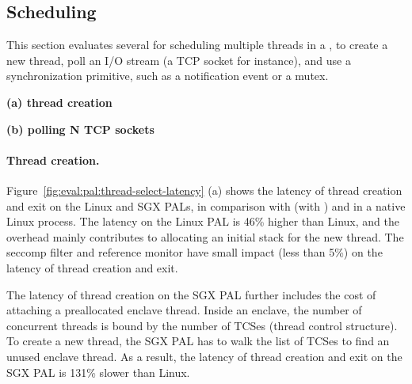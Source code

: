 
\subsection{Scheduling}
\label{sec:eval:pal:sched}

This section evaluates several \hostapis{} for scheduling multiple threads
in a \picoproc{},
to create a new thread,
poll an I/O stream (a TCP socket for instance),
and use a synchronization primitive,
such as a notification event or a mutex. 


\begin{figure*}[t!]
\centering
\footnotesize
{}
\parbox{0.49\textwidth}{\centering\bf (a) thread creation}
\parbox{0.49\textwidth}{\centering\bf (b) polling N TCP sockets}
\caption{(a) Thread creation latency and (b) latency of polling a number of TCP sockets.
Lower is better.
The comparison is between (1)  and  on Linux; (2)  and  on the Linux PAL, with and without a \seccomp{} filter ({\bf +SC}) and reference monitor ({\bf +RM}); (3) the same \hostapis{} on the SGX PAL.}
\label{fig:eval:pal:thread-select-latency}
\end{figure*}


\paragraph{Thread creation.}
Figure~\ref{fig:eval:pal:thread-select-latency} (a)
shows the latency of thread creation and exit
on the Linux and SGX PALs,
in comparison with 
 (with )
and  in a native Linux process.
The latency on the Linux PAL is
\roughly{}46\% higher
than Linux,
and the overhead mainly contributes
to allocating an initial stack for the new thread. %
The seccomp{} filter and reference monitor
have small impact (less than 5\%)
on the latency of thread creation and exit.


The latency of thread creation on the SGX PAL further includes
the cost of attaching a preallocated enclave thread.
Inside an enclave,
the number of concurrent threads is bound by the number
of TCSes (thread control structure).
To create a new thread,
the SGX PAL has to walk the list of TCSes
to find an unused enclave thread.
As a result, the latency of thread creation and exit on the SGX PAL is \roughly{}131\% slower than Linux.




